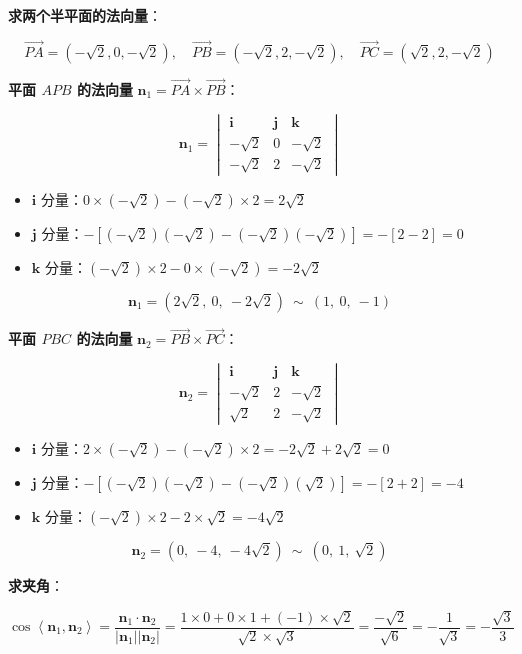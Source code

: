 \textbf{求两个半平面的法向量}：

\[\overrightarrow{PA}=\left(-\sqrt2,0,-\sqrt2\right),\quad \overrightarrow{PB}=\left(-\sqrt2,2,-\sqrt2\right),\quad \overrightarrow{PC}=\left(\sqrt2,2,-\sqrt2\right)\]

\textbf{平面 $APB$ 的法向量} $\boldsymbol n_1=\overrightarrow{PA}\times\overrightarrow{PB}$：

\[\boldsymbol n_1=\begin{vmatrix}\boldsymbol i&\boldsymbol j&\boldsymbol k\\-\sqrt2&0&-\sqrt2\\-\sqrt2&2&-\sqrt2\end{vmatrix}\]

\begin{itemize}
\item $\boldsymbol i$ 分量：$0\times(-\sqrt2)-(-\sqrt2)\times2=2\sqrt2$
\item $\boldsymbol j$ 分量：$-\left[(-\sqrt2)(-\sqrt2)-(-\sqrt2)(-\sqrt2)\right]=-[2-2]=0$
\item $\boldsymbol k$ 分量：$(-\sqrt2)\times2-0\times(-\sqrt2)=-2\sqrt2$
\end{itemize}

\[\boldsymbol n_1=\left(2\sqrt2,\ 0,\ -2\sqrt2\right)\ \sim\ (1,\ 0,\ -1)\]

\textbf{平面 $PBC$ 的法向量} $\boldsymbol n_2=\overrightarrow{PB}\times\overrightarrow{PC}$：

\[\boldsymbol n_2=\begin{vmatrix}\boldsymbol i&\boldsymbol j&\boldsymbol k\\-\sqrt2&2&-\sqrt2\\ \sqrt2&2&-\sqrt2\end{vmatrix}\]

\begin{itemize}
\item $\boldsymbol i$ 分量：$2\times(-\sqrt2)-(-\sqrt2)\times2=-2\sqrt2+2\sqrt2=0$
\item $\boldsymbol j$ 分量：$-\left[(-\sqrt2)(-\sqrt2)-(-\sqrt2)(\sqrt2)\right]=-[2+2]=-4$
\item $\boldsymbol k$ 分量：$(-\sqrt2)\times2-2\times\sqrt2=-4\sqrt2$
\end{itemize}

\[\boldsymbol n_2=\left(0,\ -4,\ -4\sqrt2\right)\ \sim\ \left(0,\ 1,\ \sqrt2\right)\]

\textbf{求夹角}：

\[\cos\left\langle\boldsymbol n_1,\boldsymbol n_2\right\rangle=\frac{\boldsymbol n_1\cdot\boldsymbol n_2}{\left|\boldsymbol n_1\right|\left|\boldsymbol n_2\right|}=\frac{1\times0+0\times1+(-1)\times\sqrt2}{\sqrt2\times\sqrt3}=\frac{-\sqrt2}{\sqrt6}=-\frac1{\sqrt3}=-\frac{\sqrt3}3\]

